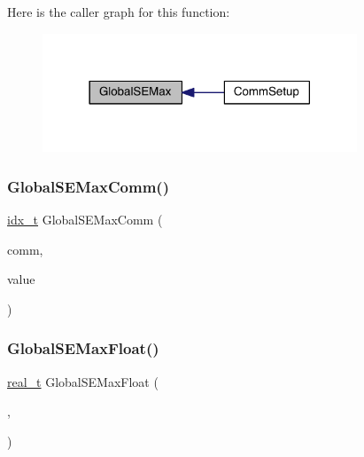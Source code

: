 Here is the caller graph for this function\+:\nopagebreak
\begin{figure}[H]
\begin{center}
\leavevmode
\includegraphics[width=266pt]{a00951_afb6bea7b43d9d070cf5e7118a02a3061_icgraph}
\end{center}
\end{figure}
\mbox{\label{a00951_aa31576794c6d7b00495b4402a1a4814a}} 
\subsubsection{\texorpdfstring{Global\+S\+E\+Max\+Comm()}{GlobalSEMaxComm()}}
{\footnotesize\ttfamily \hyperlink{a00876_aaa5262be3e700770163401acb0150f52}{idx\+\_\+t} Global\+S\+E\+Max\+Comm (\begin{DoxyParamCaption}\item[{M\+P\+I\+\_\+\+Comm}]{comm,  }\item[{\hyperlink{a00876_aaa5262be3e700770163401acb0150f52}{idx\+\_\+t}}]{value }\end{DoxyParamCaption})}

\mbox{\label{a00951_aceb27ecf649a32f10ecbbdc15d8ac27a}} 
\subsubsection{\texorpdfstring{Global\+S\+E\+Max\+Float()}{GlobalSEMaxFloat()}}
{\footnotesize\ttfamily \hyperlink{a00876_a1924a4f6907cc3833213aba1f07fcbe9}{real\+\_\+t} Global\+S\+E\+Max\+Float (\begin{DoxyParamCaption}\item[{\hyperlink{a00742}{ctrl\+\_\+t} $\ast$}]{,  }\item[{\hyperlink{a00876_a1924a4f6907cc3833213aba1f07fcbe9}{real\+\_\+t}}]{ }\end{DoxyParamCaption})}

